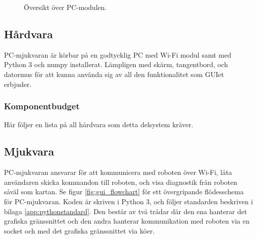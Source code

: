 \documentclass[a4paper,11pt]{article}
\begin{document}
\begin{figure}[h!]
    \caption{Översikt över PC-modulen.}
    \label{fig:unitPC}
\end{figure}
\subsection{Hårdvara}
PC-mjukvaran är körbar på en godtycklig PC med Wi-Fi modul samt med Python 3 och numpy installerat. Lämpligen med skärm, tangentbord, och datormus för att kunna använda sig av all den funktionalitet som GUIet erbjuder.

\subsubsection{Komponentbudget}
Här följer en lista på all hårdvara som detta delsystem kräver.

\begin{center}
\begin{HardwareList}
\end{HardwareList}
\end{center}

\subsection{Mjukvara}
PC-mjukvaran ansvarar för att kommunicera med roboten över Wi-Fi, låta användaren skicka kommandon till roboten, och visa diagnostik från roboten såväl som kartan. Se figur \ref{fig:gui_flowchart} för ett övergripande flödesschema för PC-mjukvaran. Koden är skriven i Python 3, och följer standarden beskriven i bilaga \ref{app:pythonstandard}. Den består av två trådar där den ena hanterar det grafiska gränssnittet och den andra hanterar kommunikation med roboten via en socket och med det grafiska gränssnittet via köer.
\end{document}
